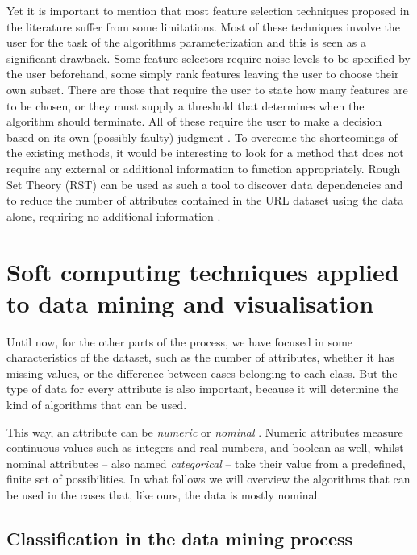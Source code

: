 Yet it is important to mention that most feature selection techniques proposed in the literature suffer from some limitations. Most of these techniques involve the user for the task of the algorithms parameterization and this is  seen as a significant drawback. Some feature selectors require noise levels to be specified by the user beforehand, some simply rank features leaving the user to choose their own subset. There are those that require the user to state how many features are to be chosen, or they must supply a threshold that determines when the algorithm should terminate. All of these require the user to make a decision based on its own (possibly faulty) judgment \cite{jensen2005semantics}. To overcome the shortcomings of the existing methods, it would be interesting to look for a method that does not require any external or additional information to function appropriately. Rough Set Theory (RST) \cite{pawlak2008rough} can be used as such a tool to discover data dependencies and to reduce the number of attributes contained in the URL dataset using the data alone, requiring no additional information \cite{jensen2005semantics}.

\section{Soft computing techniques applied to data mining and visualisation}

Until now, for the other parts of the process, we have focused in some characteristics of the dataset, such as the number of attributes, whether it has missing values, or the difference between cases belonging to each class. But the type of data for every attribute is also important, because it will determine the kind of algorithms that can be used.

This way, an attribute can be \textit{numeric} or \textit{nominal} \cite{witten2016data}. Numeric attributes measure continuous values such as integers and real numbers, and boolean as well, whilst nominal attributes -- also named \textit{categorical} -- take their value from a predefined, finite set of possibilities. In what follows we will overview the algorithms that can be used in the cases that, like ours, the data is mostly nominal.

\subsection{Classification in the data mining process}


